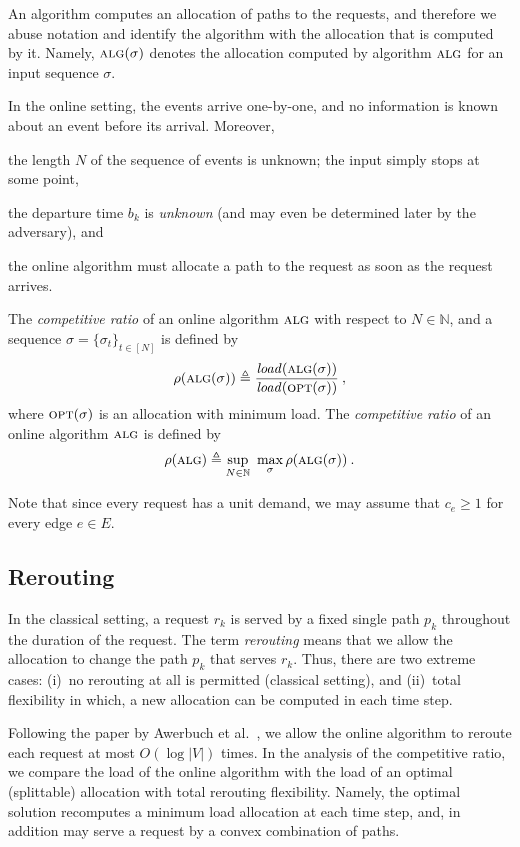 \documentclass[11pt]{article}
\newenvironment{proof sketch}[1]{\noindent {\emph{Proof sketch of #1:}}}{\hfill \qed}
\newcommand{\eqdf}{\triangleq}
\newcommand{\NNN}{[N]}
\newcommand{\alg}{\textsc{alg}}
\newcommand{\opt}{\textsc{opt}}
\newcommand{\TE}{b_k}
\newcommand{\event}{\text{$\sigma$}}
\newcommand{\load}{\text{\textit{load}}}
\newcommand{\NN}{{\mathbb{N}}}
\begin{document}
An algorithm computes an allocation of paths to the requests, and
therefore we abuse notation and identify the algorithm with the
allocation that is computed by it. Namely, $\alg(\sigma)$ denotes the
allocation computed by algorithm $\alg$ for an input sequence
$\event$.

In the online setting, the events arrive one-by-one, and no information is known about an event before its arrival.
Moreover,
\begin{inparaenum}[(1)]
  \item the length $N$ of the sequence of events is unknown; the input simply stops at some point,
  \item the departure time $\TE$ is \emph{unknown} (and may even be determined later by the adversary),  and
  \item the online algorithm must allocate a path to the request as soon as the request arrives.
\end{inparaenum}

The \emph{competitive ratio} of an online algorithm $\alg$ with respect to $N \in \NN$, and a sequence $\event=\{\event_t\}_{t \in \NNN}$ is defined
by
\[
\rho(\alg(\sigma)) \eqdf \frac{\load(\alg(\sigma))}{\load(\opt(\sigma))} \:,
\]
where $\opt(\sigma)$ is an allocation with minimum load.
The \emph{competitive ratio} of an online algorithm $\alg$ is defined by
\[
\rho(\alg) \eqdf \sup_{N \in \NN}~\max_{\event} \rho(\alg(\sigma)) \:.
\]

\noindent
Note that since every request has a unit demand, we may assume that $c_e \geq 1$ for every edge $e \in E$.
\subsection{Rerouting}
In the classical setting, a request $r_k$ is served by a fixed single
path $p_k$ throughout the duration of the request.  The term \emph{rerouting} means that we allow the allocation to change the path $p_k$ that serves $r_k$.  Thus, there are two extreme cases: (i)~no rerouting at all is permitted (classical
setting), and (ii)~total
flexibility in which, a new allocation can be computed in each time step.

Following the paper by Awerbuch et al.~\cite{awerbuch2001competitive}, we allow the online algorithm to reroute each request
at most $O(\log |V|)$ times. In the analysis of the competitive ratio,
we compare the load of the online algorithm with the load of an
optimal (splittable) allocation with total rerouting flexibility. Namely, the
optimal solution recomputes a minimum load allocation at each time step, and, in addition may serve a request by a convex combination of paths.
\end{document}
